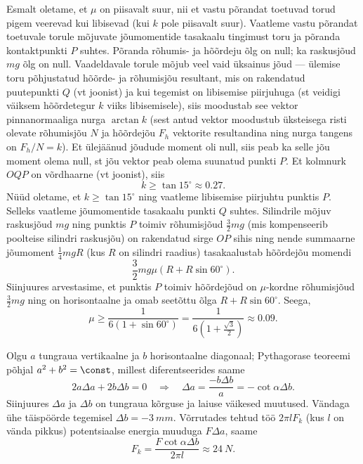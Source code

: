 \documentclass[10pt, twoside]{article}
\begin{document}
{Esmalt oletame, et $\mu$ on piisavalt suur, nii et vastu põrandat toetuvad torud pigem veerevad kui libisevad (kui $k$ pole piisavalt suur). Vaatleme vastu põrandat toetuvale torule mõjuvate jõumomentide tasakaalu tingimust toru ja põranda kontaktpunkti $P$ suhtes. Põranda rõhumis- ja hõõrdeju õlg on null; ka raskusjõud $mg$ õlg on null. Vaadeldavale torule mõjub veel vaid üksainus jõud --- ülemise toru põhjustatud hõõrde- ja rõhumisjõu resultant, mis on rakendatud puutepunkti $Q$ (vt joonist) ja kui tegemist on libisemise piirjuhuga (st veidigi väiksem hõõrdetegur $k$ viiks libisemisele), siis moodustab see vektor pinnanormaaliga nurga $\arctan k$ (sest antud vektor moodustub üksteisega risti olevate rõhumisjõu $N$ ja hõõrdejõu $F_h$ vektorite resultandina ning nurga tangens on $F_h/N=k$). Et ülejäänud jõudude moment oli null, siis peab ka selle jõu moment olema null,
st jõu vektor peab olema suunatud punkti $P$. Et kolmnurk $OQP$ on võrdhaarne (vt joonist),
siis
\[
k\ge \tan 15^\circ\approx \num{0,27}.
\]
Nüüd oletame, et $k \ge \tan 15^\circ$ ning vaatleme libisemise piirjuhtu punktis $P$. Selleks vaatleme jõumomentide tasakaalu punkti $Q$ suhtes.
Silindrile mõjuv raskusjõud $mg$ ning punktis $P$ toimiv rõhumisjõud $\frac 32 mg$ (mis kompenseerib poolteise silindri raskusjõu) on rakendatud sirge $OP$ sihis ning nende summaarne jõumoment $\frac 14mgR$ (kus $R$ on silindri raadius) tasakaalustab hõõrdejõu momendi 
\[
\frac 32 mg\mu \left(R+R\sin 60^\circ\right).
\]
Siinjuures arvestasime, et punktis $P$ toimiv hõõrdejõud on $\mu$-kordne rõhumisjõud $\frac 32 mg$ ning on horisontaalne ja omab seetõttu õlga $R+R\sin 60^\circ$. Seega,
\[
\mu \ge \frac{1}{6\left(1+\sin 60^\circ\right)}=\frac{1}{6\left(1+\frac{\sqrt 3}{2}\right)}\approx \num{0,09}.
\]
\probend
\bigskip


\solu
\osa Olgu $a$ tungraua vertikaalne ja $b$ horisontaalne diagonaal; Pythagorase teoreemi
põhjal $a^2 + b^2 = \const$, millest diferentseerides saame
\[
2 a \Delta a+2 b \Delta b=0 \quad \Rightarrow \quad \Delta a=\frac{-b \Delta b}{a}=-\cot \alpha \Delta b.
\]
Siinjuures $\Delta a$ ja $\Delta b$ on tungraua kõrguse ja laiuse väikesed muutused. Vändaga ühe
täispöörde tegemisel $\Delta b = \SI{-3}{mm}$. Võrrutades tehtud töö $2\pi lF_k$ (kus $l$ on vända
pikkus) potentsiaalse energia muuduga $F\Delta a$, saame
\[
F_{k} =\frac{F \cot \alpha \Delta b}{2 \pi l} \approx \SI{24}{N}.
\]

}
\end{document}
